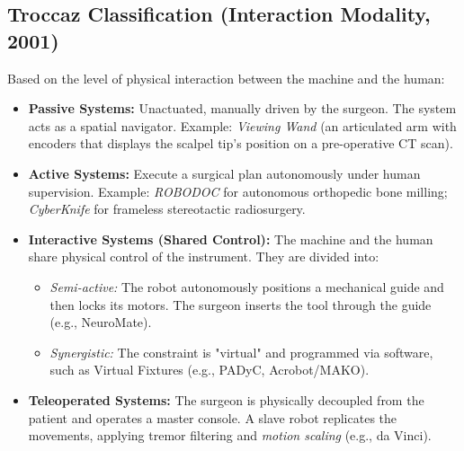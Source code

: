 \documentclass[11pt,a4paper,twoside]{report}
\begin{document}
\subsection{Troccaz Classification (Interaction Modality, 2001)}
Based on the level of physical interaction between the machine and the human:
\begin{itemize}
    \item \textbf{Passive Systems:} Unactuated, manually driven by the surgeon. The system acts as a spatial navigator. Example: \textit{Viewing Wand} (an articulated arm with encoders that displays the scalpel tip's position on a pre-operative CT scan).
    \item \textbf{Active Systems:} Execute a surgical plan autonomously under human supervision. Example: \textit{ROBODOC} for autonomous orthopedic bone milling; \textit{CyberKnife} for frameless stereotactic radiosurgery.
    \item \textbf{Interactive Systems (Shared Control):} The machine and the human share physical control of the instrument. They are divided into:
    \begin{itemize}
        \item \textit{Semi-active:} The robot autonomously positions a mechanical guide and then locks its motors. The surgeon inserts the tool through the guide (e.g., NeuroMate).
        \item \textit{Synergistic:} The constraint is "virtual" and programmed via software, such as Virtual Fixtures (e.g., PADyC, Acrobot/MAKO).
    \end{itemize}
    \item \textbf{Teleoperated Systems:} The surgeon is physically decoupled from the patient and operates a master console. A slave robot replicates the movements, applying tremor filtering and \textit{motion scaling} (e.g., da Vinci).
\end{itemize}
\end{document}
